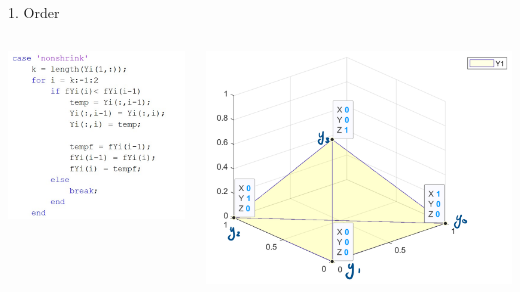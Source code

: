 \documentclass{beamer}
\begin{document}
\begin{frame}{1. Order}
	\begin{columns}
	\begin{column}{0.35\linewidth}
		\centering
		\includegraphics[width=0.95\linewidth]{Order1}
	\end{column}
	\begin{column}{0.59\linewidth}
		\centering
		\includegraphics[width=0.95\linewidth]{Order1Fig}
	\end{column}
	\end{columns}
\end{frame}
\end{document}
